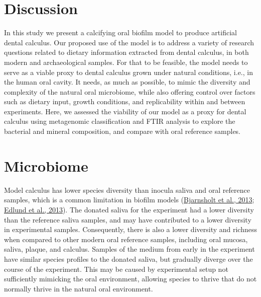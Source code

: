 \documentclass[
  letterpaper,
]{book}
\begin{document}
\hypertarget{discussion}{%
\section{Discussion}\label{discussion}}

In this study we present a calcifying oral biofilm model to produce
artificial dental calculus. Our proposed use of the model is to address
a variety of research questions related to dietary information extracted
from dental calculus, in both modern and archaeological samples. For
that to be feasible, the model needs to serve as a viable proxy to
dental calculus grown under natural conditions, i.e., in the human oral
cavity. It needs, as much as possible, to mimic the diversity and
complexity of the natural oral microbiome, while also offering control
over factors such as dietary input, growth conditions, and replicability
within and between experiments. Here, we assessed the viability of our
model as a proxy for dental calculus using metagenomic classification
and FTIR analysis to explore the bacterial and mineral composition, and
compare with oral reference samples.

\hypertarget{microbiome}{%
\section{Microbiome}\label{microbiome}}

Model calculus has lower species diversity than inocula saliva and oral
reference samples, which is a common limitation in biofilm models
(\protect\hyperlink{ref-bjarnsholtVivoBiofilm2013}{Bjarnsholt et al.,
2013}; \protect\hyperlink{ref-edlundBiofilmModel2013}{Edlund et al.,
2013}). The donated saliva for the experiment had a lower diversity than
the reference saliva samples, and may have contributed to a lower
diversity in experimental samples. Consequently, there is also a lower
diversity and richness when compared to other modern oral reference
samples, including oral mucosa, saliva, plaque, and calculus. Samples of
the medium from early in the experiment have similar species profiles to
the donated saliva, but gradually diverge over the course of the
experiment. This may be caused by experimental setup not sufficiently
mimicking the oral environment, allowing species to thrive that do not
normally thrive in the natural oral environment.
\end{document}
